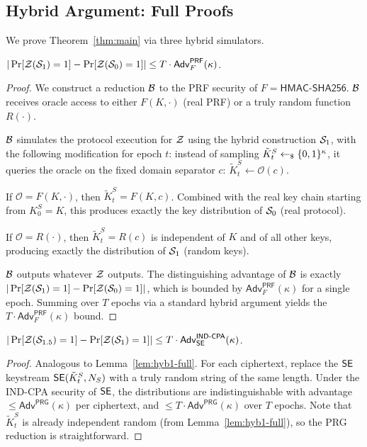 \subsection{Hybrid Argument: Full Proofs}

We prove Theorem~\ref{thm:main} via three hybrid simulators.

\begin{lemma}\label{lem:hyb1-full}
$|\Pr[\mathcal{Z}(\mathcal{S}_1)=1] - \Pr[\mathcal{Z}(\mathcal{S}_0)=1]| \leq T \cdot
\mathsf{Adv}^{\mathsf{PRF}}_{F}(\kappa)$.
\end{lemma}

\begin{proof}
We construct a reduction $\mathcal{B}$ to the PRF security of
$F = \mathsf{HMAC\text{-}SHA256}$. $\mathcal{B}$ receives oracle access to either
$F(K, \cdot)$ (real PRF) or a truly random function $R(\cdot)$.

$\mathcal{B}$ simulates the protocol execution for $\mathcal{Z}$ using the hybrid
construction $\mathcal{S}_1$, with the following modification for epoch $t$:
instead of sampling $\tilde{K}^S_t \leftarrow_{\$} \{0,1\}^\kappa$, it queries the
oracle on the fixed domain separator $c$: $\tilde{K}^S_t \leftarrow
\mathcal{O}(c)$.

If $\mathcal{O} = F(K, \cdot)$, then $\tilde{K}^S_t = F(K, c)$.
Combined with the real key chain starting from $K^S_0 = K$, this produces
exactly the key distribution of $\mathcal{S}_0$ (real protocol).

If $\mathcal{O} = R(\cdot)$, then $\tilde{K}^S_t = R(c)$ is independent
of $K$ and of all other keys, producing exactly the distribution of
$\mathcal{S}_1$ (random keys).

$\mathcal{B}$ outputs whatever $\mathcal{Z}$ outputs. The distinguishing advantage of
$\mathcal{B}$ is exactly $|\Pr[\mathcal{Z}(\mathcal{S}_1)=1] - \Pr[\mathcal{Z}(\mathcal{S}_0)=1]|$, which is
bounded by $\mathsf{Adv}^{\mathsf{PRF}}_{F}(\kappa)$ for a single epoch.
Summing over $T$ epochs via a standard hybrid argument yields the $T
\cdot \mathsf{Adv}^{\mathsf{PRF}}_{F}(\kappa)$ bound.
\end{proof}

\begin{lemma}\label{lem:hyb2-full}
$|\Pr[\mathcal{Z}(\mathcal{S}_{1.5})=1] - \Pr[\mathcal{Z}(\mathcal{S}_1)=1]| \leq T \cdot
\mathsf{Adv}^{\mathsf{IND\text{-}CPA}}_{\mathsf{SE}}(\kappa)$.
\end{lemma}

\begin{proof}
Analogous to Lemma~\ref{lem:hyb1-full}. For each ciphertext, replace the
$\mathsf{SE}$ keystream $\mathsf{SE}(\tilde{K}^S_t, N_S)$ with a truly random
string of the same length. Under the IND-CPA security of $\mathsf{SE}$, the
distributions are indistinguishable with advantage $\leq
\mathsf{Adv}^{\mathsf{PRG}}(\kappa)$ per ciphertext, and $\leq T \cdot
\mathsf{Adv}^{\mathsf{PRG}}(\kappa)$ over $T$ epochs. Note that
$\tilde{K}^S_t$ is already independent random (from Lemma~\ref{lem:hyb1-full}),
so the PRG reduction is straightforward.
\end{proof}

